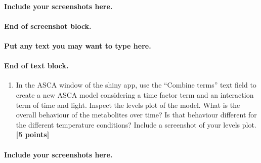 \documentclass[
]{article}
\providecommand{\tightlist}{%
  \setlength{\itemsep}{0pt}\setlength{\parskip}{0pt}}
\begin{document}
\hypertarget{include-your-screenshots-here.-3}{%
\paragraph{\texorpdfstring{Include your screenshots here.\\
}{Include your screenshots here. }}\label{include-your-screenshots-here.-3}}

\hypertarget{end-of-screenshot-block.-3}{%
\paragraph{\texorpdfstring{End of screenshot block.\\
}{End of screenshot block. }}\label{end-of-screenshot-block.-3}}

\hfill\break

\hypertarget{put-any-text-you-may-want-to-type-here.-35}{%
\paragraph{Put any text you may want to type
here.}\label{put-any-text-you-may-want-to-type-here.-35}}

\hypertarget{end-of-text-block.-37}{%
\paragraph{End of text block.}\label{end-of-text-block.-37}}

\begin{enumerate}
\def\labelenumi{\Alph{enumi})}
\setcounter{enumi}{4}
\tightlist
\item
  In the ASCA window of the shiny app, use the ``Combine terms'' text
  field to create a new ASCA model considering a time factor term and an
  interaction term of time and light. Inspect the levels plot of the
  model. What is the overall behaviour of the metabolites over time? Is
  that behaviour different for the different temperature conditions?
  Include a screenshot of your levels plot. \textbf{{[}5 points{]}}
\end{enumerate}

\hypertarget{include-your-screenshots-here.-4}{%
\paragraph{\texorpdfstring{Include your screenshots here.\\
}{Include your screenshots here. }}\label{include-your-screenshots-here.-4}}
\end{document}

